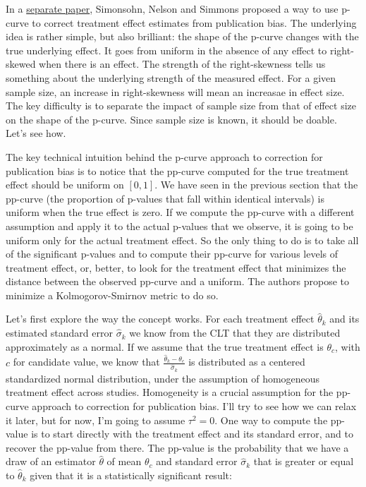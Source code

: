 \documentclass[
]{book}
\theoremstyle{definition}
\theoremstyle{definition}
\theoremstyle{definition}
\theoremstyle{definition}
\theoremstyle{remark}
\begin{document}
In a \href{https://poseidon01.ssrn.com/delivery.php?ID=968120070017096022067095015077090081127015066012065038099103064095066125118101087000019101125033110002058114102117068031082117013010054030001011069073086069105087004037003126007029115080118115116004080116094099076097092111007065003101127024028025084\&EXT=pdf}{separate paper}, Simonsohn, Nelson and Simmons proposed a way to use p-curve to correct treatment effect estimates from publication bias.
The underlying idea is rather simple, but also brilliant: the shape of the p-curve changes with the true underlying effect.
It goes from uniform in the absence of any effect to right-skewed when there is an effect.
The strength of the right-skewness tells us something about the underlying strength of the measured effect.
For a given sample size, an increase in right-skewness will mean an increasae in effect size.
The key difficulty is to separate the impact of sample size from that of effect size on the shape of the p-curve.
Since sample size is known, it should be doable.
Let's see how.

The key technical intuition behind the p-curve approach to correction for publication bias is to notice that the pp-curve computed for the true treatment effect should be uniform on \(\left[0,1\right]\).
We have seen in the previous section that the pp-curve (the proportion of p-values that fall within identical intervals) is uniform when the true effect is zero.
If we compute the pp-curve with a different assumption and apply it to the actual p-values that we observe, it is going to be uniform only for the actual treatment effect.
So the only thing to do is to take all of the significant p-values and to compute their pp-curve for various levels of treatment effect, or, better, to look for the treatment effect that minimizes the distance between the observed pp-curve and a uniform.
The authors propose to minimize a Kolmogorov-Smirnov metric to do so.

Let's first explore the way the concept works.
For each treatment effect \(\hat{\theta}_k\) and its estimated standard error \(\hat{\sigma}_k\) we know from the CLT that they are distributed approximately as a normal.
If we assume that the true treatment effect is \(\theta_c\), with \(c\) for candidate value, we know that \(\frac{\hat{\theta}_k-\theta_c}{\hat{\sigma}_k}\) is distributed as a centered standardized normal distribution, under the assumption of homogeneous treatment effect across studies.
Homogeneity is a crucial assumption for the pp-curve approach to correction for publication bias.
I'll try to see how we can relax it later, but for now, I'm going to assume \(\tau^2=0\).
One way to compute the pp-value is to start directly with the treatment effect and its standard error, and to recover the pp-value from there.
The pp-value is the probability that we have a draw of an estimator \(\hat{\theta}\) of mean \(\theta_c\) and standard error \(\hat{\sigma}_k\) that is greater or equal to \(\hat{\theta}_k\) given that it is a statistically significant result:
\end{document}
